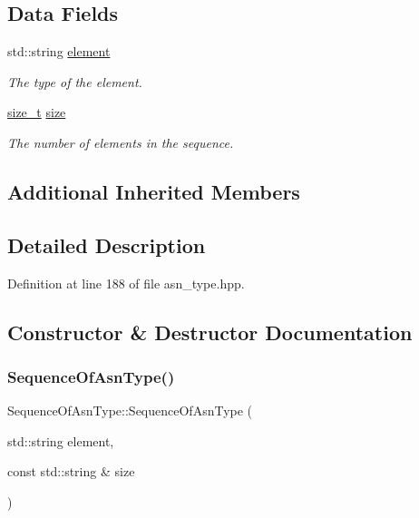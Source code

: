 \subsection*{Data Fields}
\begin{DoxyCompactItemize}
\item 
std\+::string \hyperlink{classSequenceOfAsnType_acb3e394c49163d310a53b0faabdcddf2}{element}
\begin{DoxyCompactList}\small\item\em The type of the element. \end{DoxyCompactList}\item 
\hyperlink{tutorial__fpt__2017_2intro_2sixth_2test_8c_a7c94ea6f8948649f8d181ae55911eeaf}{size\+\_\+t} \hyperlink{classSequenceOfAsnType_adbb06897b056678141962633b00ea6ca}{size}
\begin{DoxyCompactList}\small\item\em The number of elements in the sequence. \end{DoxyCompactList}\end{DoxyCompactItemize}
\subsection*{Additional Inherited Members}


\subsection{Detailed Description}


Definition at line 188 of file asn\+\_\+type.\+hpp.



\subsection{Constructor \& Destructor Documentation}
\mbox{\label{classSequenceOfAsnType_a53f4989e17c389c1d37438d4d68b62f6}} 
\subsubsection{\texorpdfstring{Sequence\+Of\+Asn\+Type()}{SequenceOfAsnType()}}
{\footnotesize\ttfamily Sequence\+Of\+Asn\+Type\+::\+Sequence\+Of\+Asn\+Type (\begin{DoxyParamCaption}\item[{std\+::string}]{element,  }\item[{const std\+::string \&}]{size }\end{DoxyParamCaption})}



